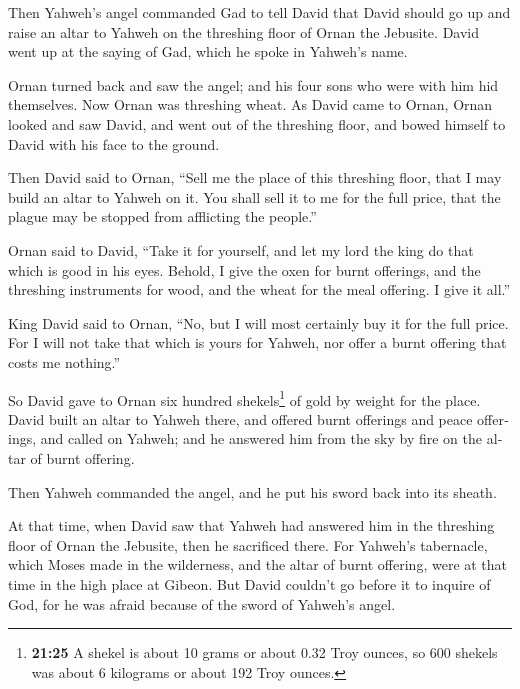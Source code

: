\begin{paracol}{2}
\begin{otherlanguage}{english}
 Then Yahweh's angel commanded Gad to tell David that
David should go up and raise an altar to Yahweh on the threshing floor
of Ornan the Jebusite.  David went up at the saying of
Gad, which he spoke in Yahweh's name.

 Ornan turned back and saw the angel; and his four sons
who were with him hid themselves. Now Ornan was threshing wheat.
 As David came to Ornan, Ornan looked and saw David, and
went out of the threshing floor, and bowed himself to David with his
face to the ground.

 Then David said to Ornan, ``Sell me the place of this
threshing floor, that I may build an altar to Yahweh on it. You shall
sell it to me for the full price, that the plague may be stopped from
afflicting the people.''

 Ornan said to David, ``Take it for yourself, and let my
lord the king do that which is good in his eyes. Behold, I give the oxen
for burnt offerings, and the threshing instruments for wood, and the
wheat for the meal offering. I give it all.''

 King David said to Ornan, ``No, but I will most
certainly buy it for the full price. For I will not take that which is
yours for Yahweh, nor offer a burnt offering that costs me nothing.''

 So David gave to Ornan six hundred shekels\footnote{\textbf{21:25}
  A shekel is about 10 grams or about 0.32 Troy ounces, so 600 shekels
  was about 6 kilograms or about 192 Troy ounces.} of gold by weight for
the place.  David built an altar to Yahweh there, and
offered burnt offerings and peace offerings, and called on Yahweh; and
he answered him from the sky by fire on the altar of burnt offering.

 Then Yahweh commanded the angel, and he put his sword
back into its sheath.

 At that time, when David saw that Yahweh had answered
him in the threshing floor of Ornan the Jebusite, then he sacrificed
there.  For Yahweh's tabernacle, which Moses made in the
wilderness, and the altar of burnt offering, were at that time in the
high place at Gibeon.  But David couldn't go before it to
inquire of God, for he was afraid because of the sword of Yahweh's
angel.

\end{otherlanguage}


\end{paracol}
